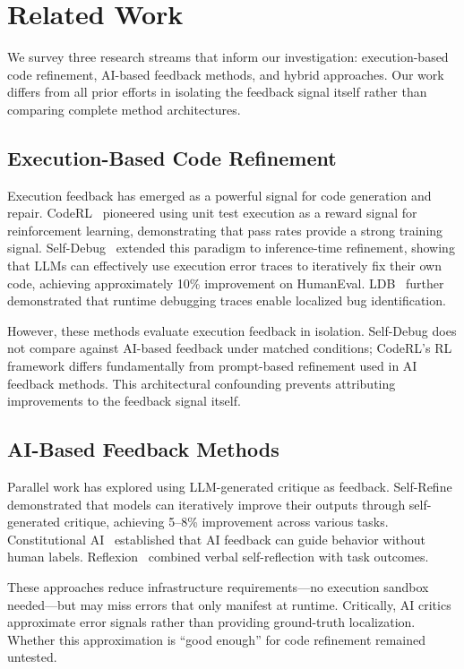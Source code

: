 \section{Related Work}
\label{sec:related}

We survey three research streams that inform our investigation: execution-based code refinement, AI-based feedback methods, and hybrid approaches. Our work differs from all prior efforts in isolating the feedback signal itself rather than comparing complete method architectures.

\subsection{Execution-Based Code Refinement}

Execution feedback has emerged as a powerful signal for code generation and repair. CodeRL~\cite{le2022coderl} pioneered using unit test execution as a reward signal for reinforcement learning, demonstrating that pass rates provide a strong training signal. Self-Debug~\cite{chen2023selfdebug} extended this paradigm to inference-time refinement, showing that LLMs can effectively use execution error traces to iteratively fix their own code, achieving approximately 10\% improvement on HumanEval. LDB~\cite{li2024ldb} further demonstrated that runtime debugging traces enable localized bug identification.

However, these methods evaluate execution feedback in isolation. Self-Debug does not compare against AI-based feedback under matched conditions; CodeRL's RL framework differs fundamentally from prompt-based refinement used in AI feedback methods. This architectural confounding prevents attributing improvements to the feedback signal itself.

\subsection{AI-Based Feedback Methods}

Parallel work has explored using LLM-generated critique as feedback. Self-Refine~\cite{madaan2023selfrefine} demonstrated that models can iteratively improve their outputs through self-generated critique, achieving 5--8\% improvement across various tasks. Constitutional AI~\cite{bai2022constitutional} established that AI feedback can guide behavior without human labels. Reflexion~\cite{shinn2023reflexion} combined verbal self-reflection with task outcomes.

These approaches reduce infrastructure requirements---no execution sandbox needed---but may miss errors that only manifest at runtime. Critically, AI critics approximate error signals rather than providing ground-truth localization. Whether this approximation is ``good enough'' for code refinement remained untested.

